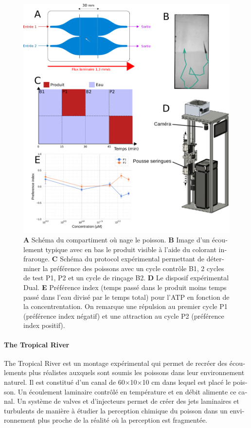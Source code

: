 \begin{otherlanguage}{french}
    \begin{figure}[h!]
      \centering
      \includegraphics[width=1\textwidth]{part_2/assets/resume1.png}
      \caption{\textbf{A} Schéma du compartiment où nage le poisson. \textbf{B} Image d'un écoulement typique avec en bas le produit visible à l'aide du colorant infrarouge. \textbf{C} Schéma du protocol expérimental permettant de déterminer la préférence des poissons avec un cycle contrôle B1, 2 cycles de test P1, P2 et un cycle de rinçage B2. \textbf{D} Le disposif expérimental Dual. \textbf{E} Préférence index (temps passé dans le produit moins temps passé dans l'eau divisé par le temps total) pour l'ATP en fonction de la concentrentation. On remarque une répulsion au premier cycle P1 (préférence index négatif) et une attraction au cycle P2 (préférence index positif).}
      \label{}
    \end{figure}

\paragraph{The Tropical River} The Tropical River est un montage expérimental qui permet de recréer des écoulements plus réalistes auxquels sont soumis les poissons dans leur environnement naturel. Il est constitué d'un canal de 60×10×10 cm dans lequel est placé le poisson. Un écoulement laminaire contrôlé en température et en débit alimente ce canal. Un système de valves et d'injecteurs permet de créer des jets laminaires et turbulents de manière à étudier la perception chimique du poisson dans un environnement plus proche de la réalité où la perception est fragmentée.


\end{otherlanguage}
